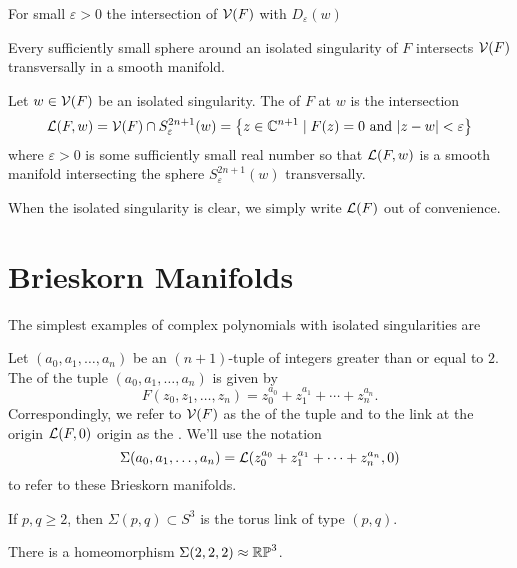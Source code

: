 \begin{theorem}
  For small $\varepsilon>0$ the intersection of $\mathcal{V}(F)$ with $D_\varepsilon(w)$
\end{theorem}

\begin{proposition}
	Every sufficiently small sphere around an isolated singularity of $F$ intersects $\mathcal{V}(F)$ transversally in a smooth manifold.
\end{proposition}

\begin{definition}
	Let $w\in \mathcal{V}(F)$ be an isolated singularity. The  of $F$ at $w$ is the intersection
	\[
		\mathcal{L}(F, w) = \mathcal{V}(F) \cap S^{2n+1}_\varepsilon(w) = \left\{ z\in \mathbb{C}^{n+1} \mid F(z)=0\textrm{ and } |z-w|<\varepsilon\right\}
	\]
	where $\varepsilon > 0$ is some sufficiently small real number so that $\mathcal{L}(F,w)$ is a smooth manifold intersecting the sphere $S^{2n+1}_\varepsilon(w)$ transversally.
\end{definition}

When the isolated singularity is clear, we simply write $\mathcal{L}(F)$ out of convenience.

\section{Brieskorn Manifolds}\label{sec:brieskorn-manifolds}
The simplest examples of complex polynomials with isolated singularities are 

\begin{definition}
	Let $(a_0,a_1,\ldots, a_n)$ be an $(n+1)$-tuple of integers greater than or equal to $2$. The  of the tuple $(a_0,a_1,\ldots, a_n)$ is given by
	\[
		F(z_0,z_1,\ldots, z_n) = z_0^{a_0} + z_1^{a_1} +\cdots + z_n^{a_n}.
	\]
	Correspondingly, we refer to $\mathcal{V}(F)$ as the  of the tuple and to the link at the origin $\mathcal{L}(F,0)$ origin as the . We'll use the notation
	\[
		\Sigma(a_0,a_1,\ldots, a_n) =\mathcal{L}(z_0^{a_0}+z_1^{a_1}+\cdots+z_n^{a_n}, 0)
	\]
	to refer to these Brieskorn manifolds.
\end{definition}


\begin{proposition}
	If $p,q\geq 2$, then $\Sigma(p,q)\subset S^3$ is the torus link of type $(p,q)$.
\end{proposition}

\begin{proposition}
	There is a homeomorphism $\Sigma(2,2,2)\approx \mathbb{RP}^3$.
\end{proposition}

